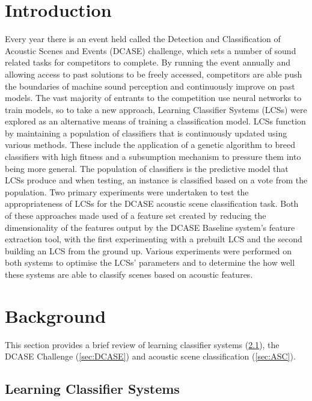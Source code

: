 \documentclass[11pt]{article}
\begin{document}
\section{Introduction}
Every year there is an event held called the Detection and Classification of Acoustic Scenes and Events (DCASE) challenge, which sets a number of sound related tasks for competitors to complete. By running the event annually and allowing access to past solutions to be freely accessed, competitors are able push the boundaries of machine sound perception and continuously improve on past models. The vast majority of entrants to the competition use neural networks to train models, so to take a new approach, Learning Classifier Systems (LCSs) were explored as an alternative means of training a classification model. LCSs function by maintaining a population of classifiers that is continuously updated using various methods. These include the application of a genetic algorithm to breed classifiers with high fitness and a subsumption mechanism to pressure them into being more general. The population of classifiers is the predictive model that LCSs produce and when testing, an instance is classified based on a vote from the population. Two primary experiments were undertaken to test the appropriateness of LCSs for the DCASE acoustic scene classification task. Both of these approaches made used of a feature set created by reducing the dimensionality of the features output by the DCASE Baseline system’s feature extraction tool, with the first experimenting with a prebuilt LCS and the second building an LCS from the ground up. Various experiments were performed on both systems to optimise the LCSs’ parameters and to determine the how well these systems are able to classify scenes based on acoustic features.




\section{Background}

This section provides a brief review of learning classifier systems (\ref{sec:LCS}), the DCASE Challenge (\ref{sec:DCASE}) and acoustic scene classification (\ref{sec:ASC}).



\subsection{Learning Classifier Systems}
\label{sec:LCS}
\end{document}
